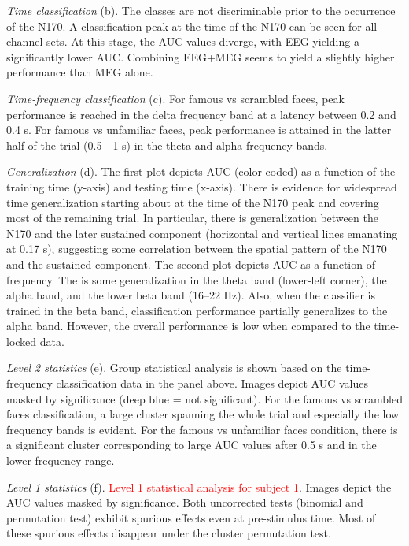 \documentclass[utf8]{frontiersSCNS} %
\newcommand{\red}[1]{\textcolor{red}{#1}}
\begin{document}
\textit{Time classification} (b). The classes are not discriminable prior to the occurrence of the N170. A classification peak at the time of the N170 can be seen for all channel sets. At this stage, the AUC values diverge, with EEG yielding a significantly lower AUC. Combining EEG+MEG seems to yield a slightly higher performance than MEG alone.

\textit{Time-frequency classification} (c). For famous vs scrambled faces, peak performance is reached in the delta frequency band at a latency between 0.2 and 0.4 s. For famous vs unfamiliar faces, peak performance is attained in the latter half of the trial (0.5 - 1 s) in the theta and alpha frequency bands.

\textit{Generalization} (d). The first plot depicts AUC (color-coded) as a function of the training time (y-axis) and testing time (x-axis). There is evidence for widespread time generalization starting about at the time of the N170 peak and covering most of the remaining trial. In particular, there is generalization between the N170 and the later sustained component (horizontal and vertical lines emanating at 0.17 s), suggesting some correlation between the spatial pattern of the N170 and the sustained component.
The second plot depicts AUC as a function of frequency. The is some generalization in the theta band (lower-left corner), the alpha band, and the lower beta band (16--22 Hz). Also, when the classifier is trained in the beta band, classification performance partially generalizes to the alpha band. However, the overall performance is low when compared to the time-locked data.

\textit{Level 2 statistics} (e). Group statistical analysis is shown based on the time-frequency classification data in the panel above. Images depict AUC values masked by significance (deep blue = not significant). For the famous vs scrambled faces classification, a large cluster spanning the whole trial and especially the low frequency bands is evident. For the famous vs unfamiliar faces condition, there is a significant  cluster corresponding to large AUC values after 0.5 s and in the lower frequency range.

\textit{Level 1 statistics} (f). \red{Level 1 statistical analysis for subject 1}. Images depict the AUC values masked by significance. Both uncorrected tests (binomial and permutation test) exhibit spurious effects even at pre-stimulus time. Most of these spurious effects disappear under the cluster permutation test.
\end{document}
